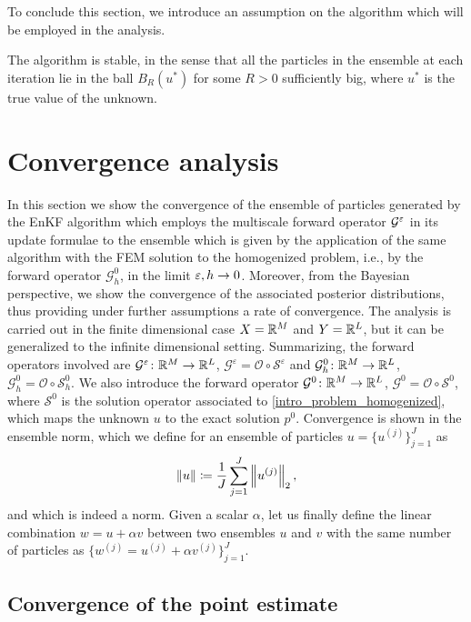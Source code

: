 \documentclass[10pt]{article}
\begin{document}
To conclude this section, we introduce an assumption on the algorithm which will be employed in the analysis.
\begin{assumption} \label{ass_algo} The algorithm is stable, in the sense that all the particles in the ensemble at each iteration lie in the ball $B_R(u^*)$ for some $R > 0$ sufficiently big, where $u^*$ is the true value of the unknown.
\end{assumption}

\section{Convergence analysis}\label{Convergence}

In this section we show the convergence of the ensemble of particles generated by the EnKF algorithm which employs the multiscale forward operator $\mathcal G^\varepsilon$ in its update formulae to the ensemble which is given by the application of the same algorithm with the FEM solution to the homogenized problem, i.e., by the forward operator $\mathcal G^0_h$, in the limit $\varepsilon, h \to 0$. Moreover, from the Bayesian perspective, we show the convergence of the associated posterior distributions, thus providing under further assumptions a rate of convergence. The analysis is carried out in the finite dimensional case $X = \mathbb{R}^M$ and $Y = \mathbb{R}^L$, but it can be generalized to the infinite dimensional setting. Summarizing, the forward operators involved are $\mathcal{G}^{\varepsilon} \colon \mathbb{R}^M \to \mathbb{R}^L$, $\mathcal{G}^{\varepsilon} = \mathcal{O} \circ \mathcal{S}^{\varepsilon}$ and $\mathcal{G}^0_h \colon \mathbb{R}^M \to \mathbb{R}^L$, $\mathcal{G}^0_h = \mathcal{O} \circ \mathcal{S}^0_h$. We also introduce the forward operator $\mathcal{G}^0 \colon \mathbb{R}^M \to \mathbb{R}^L$, $\mathcal{G}^0 = \mathcal{O} \circ \mathcal{S}^0$, where $\mathcal{S}^0$ is the solution operator associated to \eqref{intro_problem_homogenized}, which maps the unknown $u$ to the exact solution $p^0$. Convergence is shown in the ensemble norm, which we define for an ensemble of particles $u = \{ u^{(j)} \}_{j = 1}^J$ as
\begin{equation} \label{ensemble_norm}
	\left\|u\right\| \coloneqq \frac{1}{J} \sum_{j=1}^J \left\|u^{(j)}\right\|_2,
\end{equation}
and which is indeed a norm. Given a scalar $\alpha$, let us finally define the linear combination $w = u + \alpha v$ between two ensembles $u$ and $v$ with the same number of particles as $\{w^{(j)} = u^{(j)} + \alpha v^{(j)}\}_{j=1}^J$.

\subsection{Convergence of the point estimate}
\end{document}
